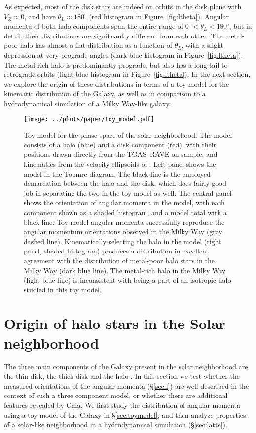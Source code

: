 \documentclass[apj, twocolappendix, numberedappendix, appendixfloats]{emulateapj}
\begin{document}
As expected, most of the disk stars are indeed on orbits in the disk plane with $V_Z\approx0$, and have $\theta_L\approx180^\circ$ (red histogram in Figure~\ref{fig:ltheta}).
Angular momenta of both halo components span the entire range of $0^\circ<\theta_L<180^\circ$, but in detail, their distributions are significantly different from each other.
The metal-poor halo has almost a flat distribution as a function of $\theta_L$, with a slight depression at very prograde angles (dark blue histogram in Figure~\ref{fig:ltheta}).
The metal-rich halo is predominantly prograde, but also has a long tail to retrograde orbits (light blue histogram in Figure~\ref{fig:ltheta}).
In the next section, we explore the origin of these distributions in terms of a toy model for the kinematic distribution of the Galaxy, as well as in comparison to a hydrodynamical simulation of a Milky Way-like galaxy.

\begin{figure*}
\begin{center}
\texttt{[image: ../plots/paper/toy\_model.pdf]}
\caption{Toy model for the phase space of the solar neighborhood.
The model consists of a halo (blue) and a disk component (red), with their positions drawn directly from the TGAS--RAVE-on sample, and kinematics from the velocity ellipsoids of \citet{bensby2003}.
Left panel shows the model in the Toomre diagram.
The black line is the employed demarcation between the halo and the disk, which does fairly good job in separating the two in the toy model as well.
The central panel shows the orientation of angular momenta in the model, with each component shown as a shaded histogram, and a model total with a black line.
Toy model angular momenta successfully reproduce the angular momentum orientations observed in the Milky Way (gray dashed line).
Kinematically selecting the halo in the model (right panel, shaded histogram) produces a distribution in excellent agreement with the distribution of metal-poor halo stars in the Milky Way (dark blue line).
The metal-rich halo in the Milky Way (light blue line) is inconsistent with being a part of an isotropic halo studied in this toy model.}
\label{fig:toy}
\end{center}
\end{figure*}

\section{Origin of halo stars in the Solar neighborhood}
The three main components of the Galaxy present in the solar neighborhood are the thin disk, the thick disk and the halo \citep[e.g.,][]{bhg2016}.
In this section we test whether the measured orientations of the angular momenta (\S\ref{sec:l}) are well described in the context of such a three component model, or whether there are additional features revealed by Gaia.
We first study the distribution of angular momenta using a toy model of the Galaxy in \S\ref{sec:toymodel}, and then analyze properties of a solar-like neighborhood in a hydrodynamical simulation (\S\ref{sec:latte}).
\end{document}
